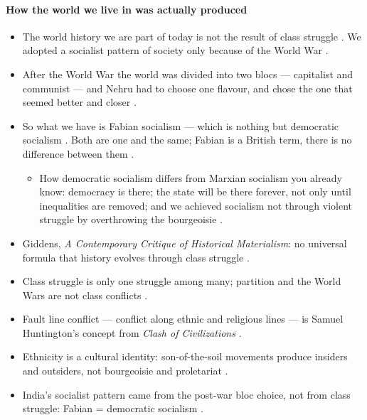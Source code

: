 \paragraph{How the world we live in was actually produced}
\begin{itemize}
    \item The world history we are part of today is not the result of class struggle . We adopted a socialist pattern of society only because of the World War .
    \item After the World War the world was divided into two blocs --- capitalist and communist --- and Nehru had to choose one flavour, and chose the one that seemed better and closer .
    \item So what we have is Fabian socialism --- which is nothing but democratic socialism . Both are one and the same; Fabian is a British term, there is no difference between them .
    \begin{itemize}
        \item How democratic socialism differs from Marxian socialism you already know: democracy is there; the state will be there forever, not only until inequalities are removed; and we achieved socialism not through violent struggle by overthrowing the bourgeoisie .
    \end{itemize}
\end{itemize}

\begin{QuickRevision}
\begin{itemize}
    \item Giddens, \emph{A Contemporary Critique of Historical Materialism}: no universal formula that history evolves through class struggle .
    \item Class struggle is only one struggle among many; partition and the World Wars are not class conflicts .
    \item Fault line conflict --- conflict along ethnic and religious lines --- is Samuel Huntington's concept from \emph{Clash of Civilizations} .
    \item Ethnicity is a cultural identity: son-of-the-soil movements produce insiders and outsiders, not bourgeoisie and proletariat .
    \item India's socialist pattern came from the post-war bloc choice, not from class struggle: Fabian = democratic socialism .
\end{itemize}
\end{QuickRevision}

